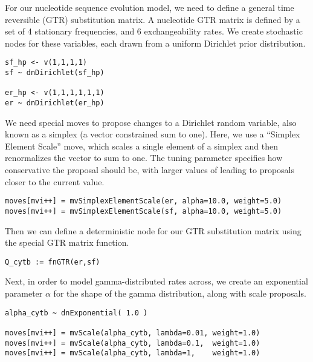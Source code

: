 For our nucleotide sequence evolution model, we need to define a general time reversible (GTR) substitution matrix.
A nucleotide GTR matrix is defined by a set of 4 stationary frequencies, and 6 exchangeability rates.
We create stochastic nodes for these variables, each drawn from a uniform Dirichlet prior distribution.

{\tt \begin{snugshade*}
\begin{lstlisting}
sf_hp <- v(1,1,1,1)
sf ~ dnDirichlet(sf_hp)

er_hp <- v(1,1,1,1,1,1)
er ~ dnDirichlet(er_hp)
\end{lstlisting}
\end{snugshade*}}

We need special moves to propose changes to a Dirichlet random variable, also known as a simplex (a vector constrained sum to one).
Here, we use a ``Simplex Element Scale'' move, which scales a single element of a simplex and then renormalizes the vector to sum to one.
The tuning parameter  specifies how conservative the proposal should be, with larger values of  leading to proposals closer to the current value.
{\tt \begin{snugshade*}
\begin{lstlisting}
moves[mvi++] = mvSimplexElementScale(er, alpha=10.0, weight=5.0)
moves[mvi++] = mvSimplexElementScale(sf, alpha=10.0, weight=5.0)
\end{lstlisting}
\end{snugshade*}}

Then we can define a deterministic node for our GTR substitution matrix using the special GTR matrix function.
{\tt \begin{snugshade*}
\begin{lstlisting}
Q_cytb := fnGTR(er,sf)
\end{lstlisting}
\end{snugshade*}}

Next, in order to model gamma-distributed rates across, we create an exponential parameter $\alpha$ for the shape of the gamma distribution, along with scale proposals.
{\tt \begin{snugshade*}
\begin{lstlisting}
alpha_cytb ~ dnExponential( 1.0 )

moves[mvi++] = mvScale(alpha_cytb, lambda=0.01, weight=1.0)
moves[mvi++] = mvScale(alpha_cytb, lambda=0.1,  weight=1.0)
moves[mvi++] = mvScale(alpha_cytb, lambda=1,    weight=1.0)
\end{lstlisting}
\end{snugshade*}}

